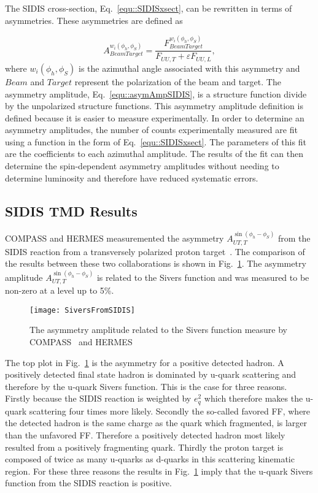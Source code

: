 The SIDIS cross-section, Eq.~\ref{equ::SIDISxsect}, can be rewritten in terms of
asymmetries.  These asymmetries are defined as

\begin{equation}
  A^{w_i(\phi_h, \phi_S)}_{BeamTarget} = \frac{F^{w_i(\phi_h,
      \phi_S)}_{BeamTarget}}{F_{UU,T}+\varepsilon F_{UU,L}},
  \label{equ::asymAmpSIDIS}
\end{equation}
\noindent
where $w_i(\phi_h, \phi_S)$ is the azimuthal angle associated with this
asymmetry and $Beam$ and $Target$ represent the polarization of the beam and
target.  The asymmetry amplitude, Eq.~\ref{equ::asymAmpSIDIS}, is a structure
function divide by the unpolarized structure functions.  This asymmetry
amplitude definition is defined because it is easier to measure experimentally.
In order to determine an asymmetry amplitudes, the number of counts
experimentally measured are fit using a function in the form of
Eq.~\ref{equ::SIDISxsect}.  The parameters of this fit are the coefficients to
each azimuthal amplitude.  The results of the fit can then determine the
spin-dependent asymmetry amplitudes without needing to determine luminosity and
therefore have reduced systematic errors.

\subsection{SIDIS TMD Results}
COMPASS and HERMES measuremented the asymmetry $A_{UT ,T}^{\sin\left(\phi_h
  -\phi_S\right)}$ from the SIDIS reaction from a transversely polarized proton
target~\cite{Alekseev:2008aa,Airapetian:2009ae}.  The comparison of the results
between these two collaborations is shown in Fig.~\ref{fig::SiversFromSIDIS}.
The asymmetry amplitude $A_{UT ,T}^{\sin\left(\phi_h-\phi_S\right)}$ is related
to the Sivers function and was measured to be non-zero at a level up to 5\%.

\begin{figure}[h!t]
  \centering \texttt{[image: SiversFromSIDIS]}
  \caption{The asymmetry amplitude related to the Sivers function measure by
    COMPASS~\cite{Alekseev:2008aa} and HERMES~\cite{Airapetian:2009ae}}
  \label{fig::SiversFromSIDIS}
\end{figure}

The top plot in Fig.~\ref{fig::SiversFromSIDIS} is the asymmetry for a positive
detected hadron.  A positively detected final state hadron is dominated by
u-quark scattering and therefore by the u-quark Sivers function.  This is the
case for three reasons.  Firstly because the SIDIS reaction is weighted by
$e_q^2$ which therefore makes the u-quark scattering four times more likely.
Secondly the so-called favored FF, where the detected hadron is the same charge
as the quark which fragmented, is larger than the unfavored FF.  Therefore a
positively detected hadron most likely resulted from a positively fragmenting
quark.  Thirdly the proton target is composed of twice as many u-quarks as
d-quarks in this scattering kinematic region.  For these three reasons the
results in Fig.~\ref{fig::SiversFromSIDIS} imply that the u-quark Sivers
function from the SIDIS reaction is positive.

